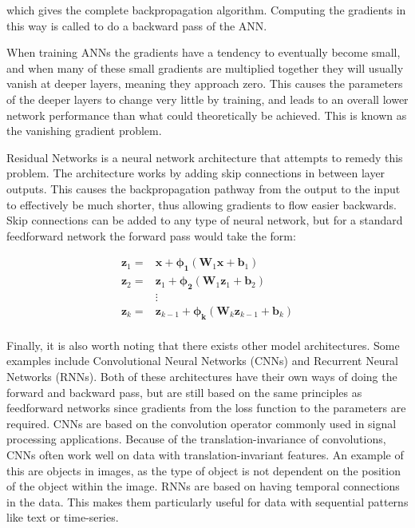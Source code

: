 \documentclass[12pt,a4paper]{book}
\begin{document}
\noindent which gives the complete backpropagation algorithm. Computing the gradients in this way is called to do a backward pass of the ANN.

When training ANNs the gradients have a tendency to eventually become small, and when many of these small gradients are multiplied together they will usually vanish at deeper layers, meaning they approach zero. This causes the parameters of the deeper layers to change very little by training, and leads to an overall lower network performance than what could theoretically be achieved. This is known as the vanishing gradient problem.

Residual Networks is a neural network architecture that attempts to remedy this problem. The architecture works by adding skip connections in between layer outputs. This causes the backpropagation pathway from the output to the input to effectively be much shorter, thus allowing gradients to flow easier backwards. Skip connections can be added to any type of neural network, but for a standard feedforward network the forward pass would take the form:

\begin{equation}
    \begin{split}
        \bm{z}_1 = & \bm{x} + \bm{\phi_1}(\bm{W}_1 \bm{x} + \bm{b}_1) \\
        \bm{z}_2 = & \bm{z}_1 + \bm{\phi_2}(\bm{W}_1 \bm{z}_1 + \bm{b}_2) \\
        & \vdots \\
        \bm{z}_k = & \bm{z}_{k-1} + \bm{\phi_k}(\bm{W}_k \bm{z}_{k-1} + \bm{b}_k) \\
    \end{split}
    \label{eq:resnet_forward}
\end{equation}

Finally, it is also worth noting that there exists other model architectures. Some examples include Convolutional Neural Networks (CNNs) and Recurrent Neural Networks (RNNs). Both of these architectures have their own ways of doing the forward and backward pass, but are still based on the same principles as feedforward networks since gradients from the loss function to the parameters are required. CNNs are based on the convolution operator commonly used in signal processing applications. Because of the translation-invariance of convolutions, CNNs often work well on data with translation-invariant features. An example of this are objects in images, as the type of object is not dependent on the position of the object within the image. RNNs are based on having temporal connections in the data. This makes them particularly useful for data with sequential patterns like text or time-series.
\end{document}
